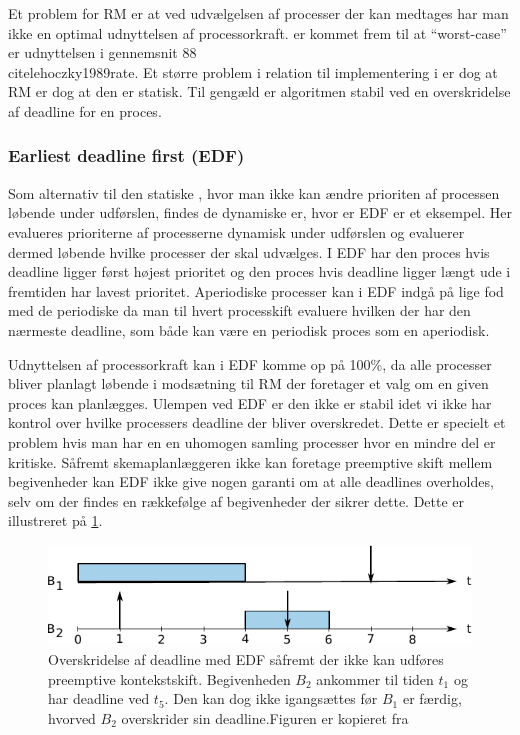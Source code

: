 Et problem for RM er at ved udvælgelsen af processer der kan medtages har man ikke en optimal udnyttelsen af processorkraft.  er kommet frem til at ``worst-case'' er udnyttelsen i gennemsnit 88\\cite{lehoczky1989rate}. Et større problem i relation til implementering i \pycsp er dog at RM er dog at den er statisk. Til gengæld er algoritmen stabil ved en overskridelse af deadline for en proces. 

\subsubsection{Earliest deadline first (EDF)}
Som alternativ til den statiske \sched, hvor man ikke kan ændre prioriten af processen løbende under udførslen, findes de dynamiske \sched er, hvor er EDF er et eksempel. Her evalueres prioriterne af processerne dynamisk under udførslen og evaluerer dermed løbende hvilke processer der skal udvælges. I EDF har den proces hvis deadline ligger først højest prioritet og den proces hvis deadline ligger længt ude i fremtiden har lavest prioritet. Aperiodiske processer kan i EDF indgå på lige fod med de periodiske da man til hvert processkift evaluere hvilken der har den nærmeste deadline, som både kan være en periodisk proces som en aperiodisk.

Udnyttelsen af processorkraft kan i EDF komme op på 100\%, da alle processer bliver planlagt løbende i modsætning til RM der foretager et valg om en given proces kan planlægges.  Ulempen ved EDF er den ikke er stabil idet vi ikke har kontrol over hvilke processers deadline der bliver overskredet. Dette er specielt et problem hvis man har en en uhomogen samling processer hvor en mindre del er kritiske. Såfremt skemaplanlæggeren ikke kan foretage preemptive skift mellem begivenheder kan EDF ikke give nogen garanti om at alle deadlines overholdes, selv om der findes en rækkefølge af begivenheder der sikrer dette. Dette er illustreret på \cref{fig:edf-nonpreemptive}.

\begin{figure}
 \begin{center}
  \includegraphics[scale=1.00]{images/edf-nonpreemptive}
  \caption{Overskridelse af deadline med EDF såfremt der ikke kan udføres preemptive kontekstskift. Begivenheden $B_2$ ankommer til tiden $t_1$ og har deadline ved $t_5$. Den kan dog ikke igangsættes før $B_1$ er færdig, hvorved $B_2$ overskrider sin deadline.Figuren er kopieret fra \cite[56]{buttazzo2005}}
  \label{fig:edf-nonpreemptive}
  \end{center}
\end{figure}

